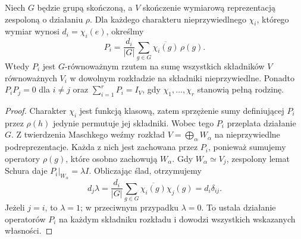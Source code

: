 \begin{stwierdzenie}
\label{aa:prop:isotypic-projector}
Niech \(G\) będzie grupą skończoną, a
\(V\) skończenie wymiarową reprezentacją zespoloną
o działaniu \(\rho\). Dla każdego charakteru
nieprzywiedlnego \(\chi_i\), którego wymiar
wynosi \(d_i=\chi_i(e)\), określmy
\[
P_i=\frac{d_i}{|G|}\sum_{g\in G}
\overline{\chi_i(g)}\,\rho(g).
\]
Wtedy \(P_i\) jest \(G\)-równoważnym rzutem
na sumę wszystkich składników \(V\) równoważnych
\(V_i\) w dowolnym rozkładzie na składniki
nieprzywiedlne. Ponadto \(P_iP_j=0\) dla \(i\ne j\)
oraz \(\sum_{i=1}^rP_i=I_V\), gdy \(\chi_1,\ldots,\chi_r\)
stanowią pełną rodzinę.
\end{stwierdzenie}
\begin{proof}
Charakter \(\chi_i\) jest funkcją klasową, zatem
sprzężenie sumy definiującej \(P_i\) przez
\(\rho(h)\) jedynie permutuje jej składniki.
Wobec tego \(P_i\) przeplata działanie \(G\).
Z twierdzenia Maschkego weźmy rozkład
\(V=\bigoplus_\alpha W_\alpha\) na nieprzywiedlne
podreprezentacje. Każda z nich jest zachowana przez
\(P_i\), ponieważ sumujemy operatory \(\rho(g)\),
które osobno zachowują \(W_\alpha\).
Gdy \(W_\alpha\simeq V_j\), zespolony lemat Schura
daje \(P_i|_{W_\alpha}=\lambda I\). Obliczając ślad,
otrzymujemy
\[
d_j\lambda
=\frac{d_i}{|G|}\sum_{g\in G}
\overline{\chi_i(g)}\chi_j(g)
=d_i\delta_{ij}.
\]
Jeżeli \(j=i\), to \(\lambda=1\); w przeciwnym
przypadku \(\lambda=0\). To ustala działanie
operatorów \(P_i\) na każdym składniku rozkładu
i dowodzi wszystkich wskazanych własności.
\end{proof}

